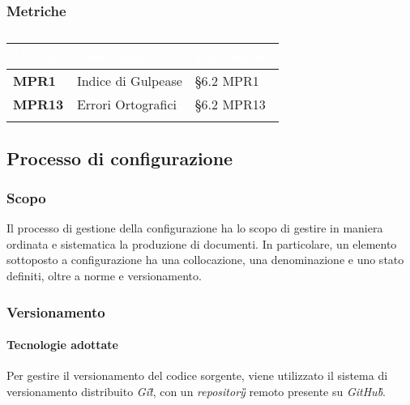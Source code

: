 			\subsubsection{Metriche}
			\setlength{\freewidth}{\dimexpr\textwidth-0\tabcolsep}
			\renewcommand{\arraystretch}{1.5}
			\setlength{\aboverulesep}{0pt}
			\setlength{\belowrulesep}{0pt}
			\begin{longtable}{L{.22\freewidth} L{.4\freewidth} L{.2\freewidth}}
				\toprule
				\textcolor{white}{\textbf{Metrica}}&
				\textcolor{white}{\textbf{Descrizione}}&	
				\textcolor{white}{\textbf{Riferimento}}\\
				\toprule
				\endhead
				
				\textbf{MPR1} & Indice di Gulpease & \S 6.2 MPR1 \\
				\textbf{MPR13} & Errori Ortografici & \S 6.2 MPR13 \\

				\bottomrule
				\caption{}
			\end{longtable}
			
	\subsection{Processo di configurazione}
	\subsubsection{Scopo}
		Il processo di gestione della configurazione ha lo scopo di gestire in maniera ordinata e sistematica la produzione di documenti. %
		 In particolare, un elemento sottoposto a configurazione ha una collocazione, una denominazione e uno stato definiti, oltre a norme e versionamento. 
 	
	\subsubsection{Versionamento}
		\paragraph*{Tecnologie adottate}
		\aCapo{}  
			Per gestire il versionamento del codice sorgente, viene utilizzato il sistema di versionamento distribuito \emph{Git\G}, con un \emph{repository\G{}} remoto presente su \emph{GitHub\G}.
			
